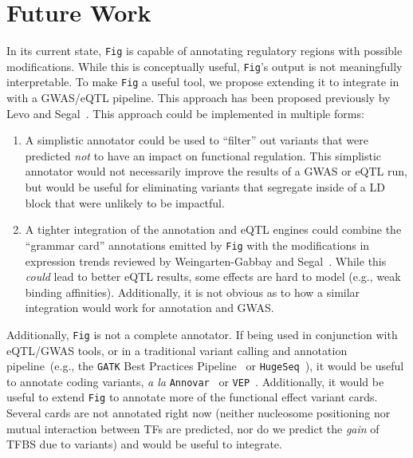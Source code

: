 \documentclass[11pt]{article}
\theoremstyle{plain}
\begin{document}
\section{Future Work}
\label{sec:future-work}

In its current state, \texttt{Fig} is capable of annotating regulatory regions with
possible modifications. While this is conceptually useful, \texttt{Fig}'s output is not
meaningfully interpretable. To make \texttt{Fig} a useful tool, we propose extending it
to integrate in with a GWAS/eQTL pipeline. This approach has been proposed previously
by Levo and Segal~\cite{levo14}. This approach could be implemented in multiple forms:

\begin{enumerate}
\item A simplistic annotator could be used to ``filter'' out variants that were predicted
\emph{not} to have an impact on functional regulation. This simplistic annotator would not
necessarily improve the results of a GWAS or eQTL run, but would be useful for eliminating
variants that segregate inside of a LD block that were unlikely to be impactful.
\item A tighter integration of the annotation and eQTL engines could combine the ``grammar
card'' annotations emitted by \texttt{Fig} with the modifications in expression trends
reviewed by Weingarten-Gabbay and Segal~\cite{weingarten14}. While this \emph{could} lead
to better eQTL results, some effects are hard to model (e.g., weak binding affinities).
Additionally, it is not obvious as to how a similar integration would work for annotation
and GWAS.
\end{enumerate}

Additionally, \texttt{Fig} is not a complete annotator. If being used in conjunction with
eQTL/GWAS tools, or in a traditional variant calling and annotation pipeline~(e.g., the
\texttt{GATK} Best Practices Pipeline~\cite{auwera13} or \texttt{HugeSeq}~\cite{lam12}),
it would be useful to annotate coding variants, \emph{a la} \texttt{Annovar}~\cite{wang10}
or \texttt{VEP}~\cite{mclaren10}. Additionally, it would be useful to extend \texttt{Fig}
to annotate more of the functional effect variant cards. Several cards are not annotated
right now (neither nucleosome positioning nor mutual interaction between TFs are predicted,
nor do we predict the \emph{gain} of TFBS due to variants) and would be useful to integrate.
\end{document}
